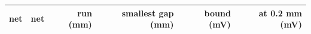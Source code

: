 \begin{tabular}{llrrrr}
\toprule
net & net & run (mm) & smallest gap (mm) & bound (mV) & at 0.2 mm (mV) \\
\midrule
\bottomrule
\end{tabular}
